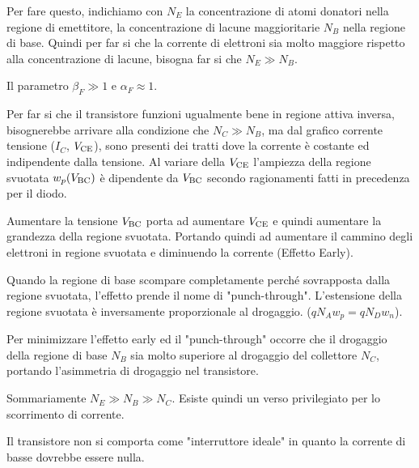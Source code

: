 \documentclass[../template]{subfiles}
\begin{document}
Per fare questo, indichiamo con $N_E$ la concentrazione di atomi donatori nella regione di emettitore, la concentrazione di lacune maggioritarie $N_B$ nella regione di base. Quindi per far si che la corrente di elettroni sia molto maggiore rispetto alla concentrazione di lacune, bisogna far si che $N_E \gg N_B$.

Il parametro $\beta_F \gg 1$ e $\alpha_F \approx 1$.

Per far si che il transistore funzioni ugualmente bene in regione attiva inversa, bisognerebbe arrivare alla condizione che $N_C \gg N_B$,
ma dal grafico corrente tensione ($I_C$, $V_{\text{CE}}$), sono presenti dei tratti dove la corrente è costante ed indipendente dalla tensione.
Al variare della $V_{\text{CE}}$ l'ampiezza della regione svuotata $w_p(V_{\text{BC}})$ è dipendente da $V_{\text{BC}}$ secondo ragionamenti fatti in precedenza per il diodo.

Aumentare la tensione $V_{\text{BC}}$ porta ad aumentare $V_{\text{CE}}$ e quindi aumentare la grandezza della regione svuotata. Portando quindi ad aumentare il cammino degli elettroni in regione svuotata e diminuendo la corrente (Effetto Early).

Quando la regione di base scompare completamente perché sovrapposta dalla regione svuotata, l'effetto prende il nome di "punch-through".
L'estensione della regione svuotata è inversamente proporzionale al drogaggio. ($qN_A w_p = q N_D w_n$).

Per minimizzare l'effetto early ed il "punch-through" occorre che il drogaggio della regione di base $N_B$ sia molto superiore al drogaggio del collettore $N_C$, portando l'asimmetria di drogaggio nel transistore.

Sommariamente $N_E \gg N_B \gg N_C$. Esiste quindi un verso privilegiato per lo scorrimento di corrente.

Il transistore non si comporta come "interruttore ideale" in quanto la corrente di basse dovrebbe essere nulla.
\end{document}
